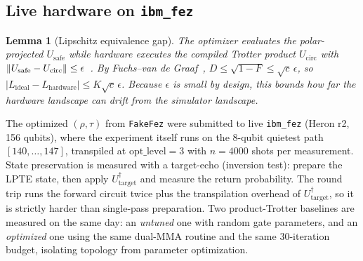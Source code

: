 \documentclass[twocolumn,aps,prl,superscriptaddress,showkeys]{revtex4-2}
\theoremstyle{plain}
\newtheorem{lemma}{Lemma}
\theoremstyle{definition}
\newcommand{\ibmfez}{\texttt{ibm\_fez}}
\newcommand{\fakefez}{\texttt{FakeFez}}
\newcommand{\Usafe}{U_{\text{safe}}}
\begin{document}
\subsection{Live hardware on \texorpdfstring{\ibmfez}{ibm_fez}}
\label{sec:hardware}

\begin{lemma}[Lipschitz equivalence gap]
\label{lem:lipschitz}
The optimizer evaluates the polar-projected $\Usafe$ while hardware executes the compiled Trotter product $U_{\mathrm{circ}}$ with $\norm{\Usafe-U_{\mathrm{circ}}}\le\epsilon$~\cite{Childs2021}. By Fuchs--van de Graaf~\cite{Fuchs1999}, $D\le\sqrt{1-F}\le\sqrt{c}\,\epsilon$, so $|L_{\mathrm{ideal}}-L_{\mathrm{hardware}}|\le K\sqrt{c}\,\epsilon$. Because $\epsilon$ is small by design, this bounds how far the hardware landscape can drift from the simulator landscape.
\end{lemma}

The optimized $(\rho,\tau)$ from \fakefez{} were submitted to live \ibmfez{} (Heron r2, 156 qubits), where the experiment itself runs on the 8-qubit quietest path $[140,\dots,147]$, transpiled at $\mathrm{opt\_level}=3$ with $n=4000$ shots per measurement. State preservation is measured with a target-echo (inversion test): prepare the LPTE state, then apply $U_{\mathrm{target}}^{\dagger}$ and measure the return probability. The round trip runs the forward circuit twice plus the transpilation overhead of $U_{\mathrm{target}}^{\dagger}$, so it is strictly harder than single-pass preparation. Two product-Trotter baselines are measured on the same day: an \emph{untuned} one with random gate parameters, and an \emph{optimized} one using the same dual-MMA routine and the same 30-iteration budget, isolating topology from parameter optimization.
\end{document}
